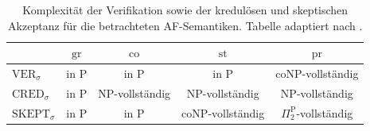 \begin{table}[h]
    \centering
    \caption{Komplexität der Verifikation sowie der kredulösen und
    skeptischen Akzeptanz für die betrachteten AF-Semantiken. 
    Tabelle adaptiert nach \cite{dvorak:2012:computational-aspects}.}
    \label{tab:complexity-af-semantics}
    \small
    \begin{tabular}{@{}lcccc@{}}
        \toprule
        & \(\mathrm{gr}\)
        & \(\mathrm{co}\)
        & \(\mathrm{st}\)
        & \(\mathrm{pr}\) \\
        \midrule
        \(\mathrm{VER}_{\sigma}\)
            & in \(\mathrm{P}\)
            & in \(\mathrm{P}\)
            & in \(\mathrm{P}\)
            & \(\mathrm{coNP}\)-vollständig \\
        \(\mathrm{CRED}_{\sigma}\)
            & in \(\mathrm{P}\)
            & \(\mathrm{NP}\)-vollständig
            & \(\mathrm{NP}\)-vollständig
            & \(\mathrm{NP}\)-vollständig \\
        \(\mathrm{SKEPT}_{\sigma}\)
            & in \(\mathrm{P}\)
            & in \(\mathrm{P}\)
            & \(\mathrm{coNP}\)-vollständig
            & \(\Pi_2^{\mathrm{P}}\)-vollständig \\
        \bottomrule
    \end{tabular}
\end{table}
